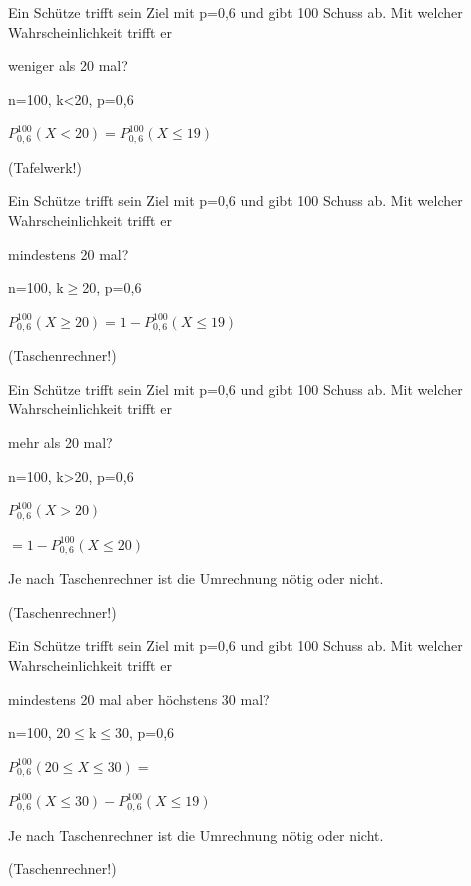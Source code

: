 \documentclass[paper=a6,landscape,ngerman,twoside=true,fontsize=12pt]{scrartcl}
\begin{document}
\begin{frage}
	\large
	Ein Schütze trifft sein Ziel mit p=0,6 und gibt 100 Schuss ab. Mit welcher Wahrscheinlichkeit trifft er 
	
	\LARGE 
	weniger als 20 mal?
	
\end{frage}
\begin{antwort}
	n=100, k<20, p=0,6
	
	\bigskip
	$P^{100}_{0,6}(X<20)=P^{100}_{0,6}(X\leq19)$
	
	(Tafelwerk!)
	
\end{antwort}
\begin{frage}
	\large
	Ein Schütze trifft sein Ziel mit p=0,6 und gibt 100 Schuss ab. Mit welcher Wahrscheinlichkeit trifft er 
	
	\LARGE 
	mindestens 20 mal?
	
\end{frage}
\begin{antwort}
	n=100, k$\geq$20, p=0,6
	
	\bigskip
	$P^{100}_{0,6}(X\geq 20)=1-P^{100}_{0,6}(X\leq 19)$
	
	 (Taschenrechner!)
	
\end{antwort}
\begin{frage}
	\large
	Ein Schütze trifft sein Ziel mit p=0,6 und gibt 100 Schuss ab. Mit welcher Wahrscheinlichkeit trifft er 
	
	\LARGE 
	mehr als 20 mal?
	
\end{frage}
\begin{antwort}
	n=100, k>20, p=0,6
	
	\bigskip
	$P^{100}_{0,6}(X>20)$ 
	
	$=1-P^{100}_{0,6}(X\leq 20)$
	
	Je nach Taschenrechner ist die Umrechnung nötig oder nicht.
	
	(Taschenrechner!)
	
\end{antwort}
\begin{frage}
	\large
	Ein Schütze trifft sein Ziel mit p=0,6 und gibt 100 Schuss ab. Mit welcher Wahrscheinlichkeit trifft er 
	
	\LARGE 
	mindestens 20 mal aber höchstens 30 mal?
	
\end{frage}
\begin{antwort}
	n=100, 20$\leq$k$\leq$30, p=0,6
	
	\bigskip\large
	$P^{100}_{0,6}(20\leq X \leq30) =$
	
	$P^{100}_{0,6}(X\leq30)-P^{100}_{0,6}(X\leq19)$
	
	Je nach Taschenrechner ist die Umrechnung nötig oder nicht.

	(Taschenrechner!)
\end{antwort}
\end{document}
